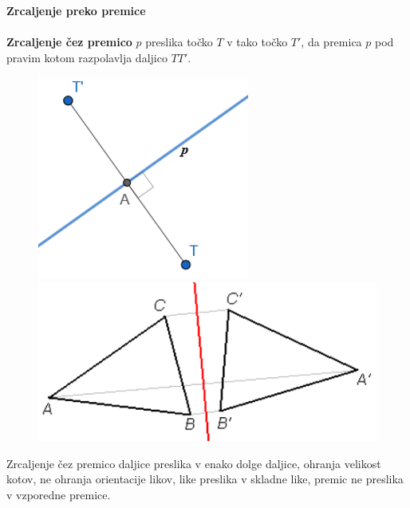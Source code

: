 


        \begin{frame}
            \large\textbf{Zrcaljenje preko premice}
            ~\\
            ~\\
            \normalsize
            \textbf{Zrcaljenje čez premico} $p$ preslika točko $T$ v tako točko $T'$, da premica $p$ pod pravim kotom razpolavlja daljico $TT'$.
            
            \begin{figure}
                \includegraphics[scale=0.5]{Slike in skice/Zrcaljenje_tocke_cez_premico.png}
                \includegraphics[scale=0.5]{Slike in skice/Zrcaljenje_lika_cez_premico.png}
            \end{figure}

            Zrcaljenje čez premico daljice preslika v enako dolge daljice, ohranja velikost kotov, ne ohranja orientacije likov, like preslika v skladne like, premic ne preslika v vzporedne premice.

        \end{frame}

